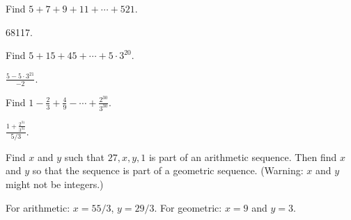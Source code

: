 \begin{questions}
	\begin{answer}
	\end{answer}
	
	
	



\question Find $5 + 7 + 9 + 11+ \cdots + 521$.

	\begin{answer}
		68117.
	\end{answer}
	
	
	


\question Find $5 + 15 + 45 + \cdots + 5\cdot 3^{20}$.

	\begin{answer}
		$\frac{5-5\cdot 3^{21}}{-2}$.
	\end{answer}
	
	
	


\question Find $1 - \frac{2}{3} + \frac{4}{9} - \cdots + \frac{2^{30}}{3^{30}}$.

	\begin{answer}
		$\frac{1 + \frac{2^{31}}{3^{31}}}{5/3}$.
	\end{answer}
	
	
	


\question Find $x$ and $y$ such that $27, x, y, 1$ is part of an arithmetic sequence.  Then find $x$ and $y$ so that the sequence is part of a geometric sequence.  (Warning: $x$ and $y$ might not be integers.) 

	\begin{answer}
		For arithmetic: $x = 55/3$, $y = 29/3$.  For geometric: $x = 9$ and $y = 3$.
	\end{answer}
	

\end{questions}
